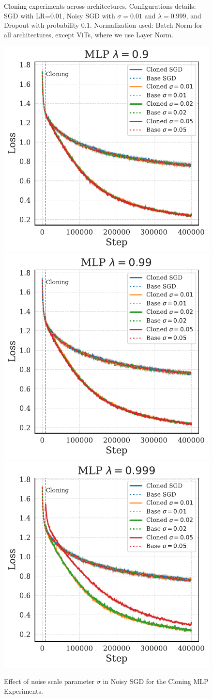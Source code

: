 \documentclass{article}
\numberwithin{figure}{section}
\begin{document}
\begin{figure}
    \caption{Cloning experiments across architectures. Configurations details: SGD with LR=0.01, Noisy SGD with $\sigma = 0.01$ and $\lambda = 0.999$, and Dropout with probability $0.1$. Normalization used: Batch Norm for all architectures, except ViTs, where we use Layer Norm.}
    \label{fig:cloning}
\end{figure}


\begin{figure}
    \centering
    \includegraphics[width=0.3\linewidth]{paper/images/mlp_noises_cloning_losses_plot_sigma_lambda_0.9.pdf}
    \includegraphics[width=0.3\linewidth]{paper/images/mlp_noises_cloning_losses_plot_sigma_lambda_0.99.pdf}
    \includegraphics[width=0.3\linewidth]{paper/images/mlp_noises_cloning_losses_plot_sigma_lambda_0.999.pdf}
    \caption{Effect of noise scale parameter $\sigma$ in Noisy SGD for the Cloning MLP Experiments.}
    \label{fig:cloning-noise-scale-mlp}
\end{figure}
\end{document}
